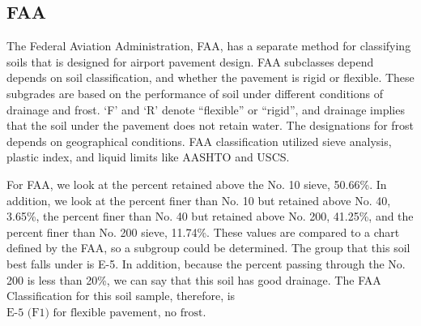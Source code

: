 \documentclass{article}
\begin{document}
\subsection{FAA} 
\par The Federal Aviation Administration, FAA, has a separate method for classifying soils that is designed for airport pavement design. FAA subclasses depend depends on soil classification, and whether the pavement is rigid or flexible. These subgrades are based on the performance of soil under different conditions of drainage and frost. `F' and `R' denote ``flexible'' or ``rigid'', and drainage implies that the soil under the pavement does not retain water. The designations for frost depends on geographical conditions. FAA classification utilized sieve analysis, plastic index, and liquid limits like AASHTO and USCS. 
\par For FAA, we look at the percent retained above the No. 10 sieve, 50.66\%. In addition, we look at the percent finer than No. 10 but retained above No. 40, 3.65\%, the percent finer than No. 40 but retained above No. 200, 41.25\%, and the percent finer than No. 200 sieve, 11.74\%. These values are compared to a chart defined by the FAA, so a subgroup could be determined. The group that this soil best falls under is E-5. In addition, because the percent passing through the No. 200 is less than 20\%, we can say that this soil has good drainage. The FAA Classification for this soil sample, therefore, is $\boxed{\text{E-5 (F1) for flexible pavement, no frost}}$.
\newpage
\end{document}
